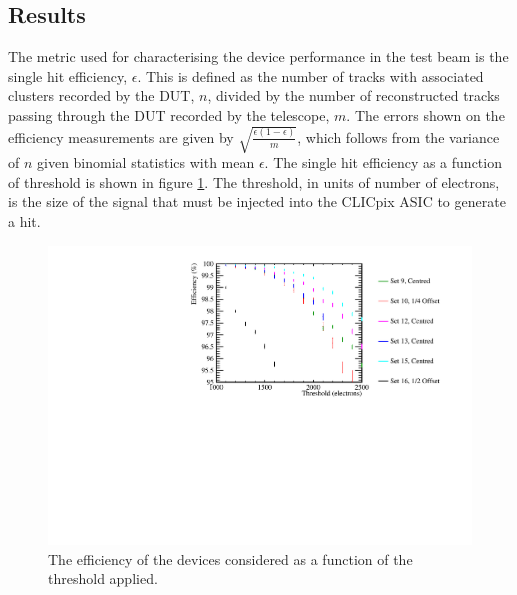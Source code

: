 
\subsection{Results}
The metric used for characterising the device performance in the test beam is the single hit efficiency, $\epsilon$.  This is defined as the number of tracks with associated clusters recorded by the DUT, $n$, divided by the number of reconstructed tracks passing through the DUT recorded by the telescope, $m$. The errors shown on the efficiency measurements are given by $\sqrt{\frac{\epsilon (1 - \epsilon)}{m}}$, which follows from the variance of $n$ given binomial statistics with mean $\epsilon$.  The single hit efficiency as a function of threshold is shown in figure \ref{fig:efficiency}.  The threshold, in units of number of electrons, is the size of the signal that must be injected into the CLICpix ASIC to generate a hit. 

\begin{figure}
\centering
\includegraphics[width=1.0\textwidth]{CLICdpVertex/Plots/TestBeamData/EfficiencyThresholdPlot.pdf}
\caption[The efficiency of the devices considered as a function of the threshold applied.]{The efficiency of the devices considered as a function of the threshold applied.}
\label{fig:efficiency}
\end{figure}

